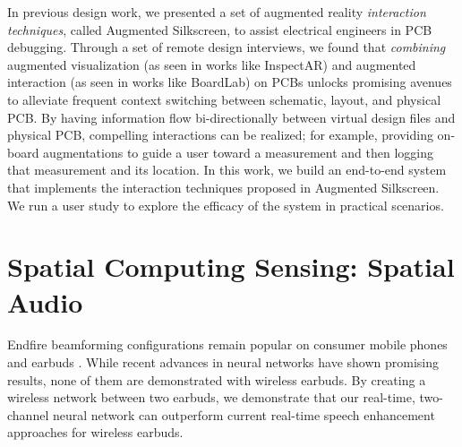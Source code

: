 \documentclass [11pt, proquest] {uwthesis}[2020/02/24]
\begin{document}
{In previous design work{\cite{Chatterjee2021AugmentedBoards}}, we presented a set of augmented reality \textit{interaction techniques}, called Augmented Silkscreen, to assist electrical engineers in PCB debugging. Through a set of remote design interviews, we found that \textit{combining} augmented visualization (as seen in works like InspectAR) and augmented interaction (as seen in works like BoardLab) on PCBs unlocks promising avenues to alleviate frequent context switching between schematic, layout, and physical PCB.
By having information flow bi-directionally between virtual design files and physical PCB, compelling interactions can be realized; for example, providing on-board augmentations to guide a user toward a measurement and then logging that measurement and its location. In this work, we build an end-to-end system that implements the interaction techniques proposed in Augmented Silkscreen. We run a user study to explore the efficacy of the system in practical scenarios.}

\section{Spatial Computing Sensing: Spatial Audio}

Endfire beamforming configurations remain popular on  consumer mobile phones and earbuds \cite{samsungglobalnewsroom_2014, airpods, sennheiser_2020, beamforming-app-note}. While recent advances in neural networks have shown promising results, none of them are demonstrated with  wireless earbuds.  By creating a wireless   network between two earbuds, we demonstrate that our real-time, two-channel neural network can outperform  current real-time speech enhancement approaches for wireless earbuds. %

\end{document}
